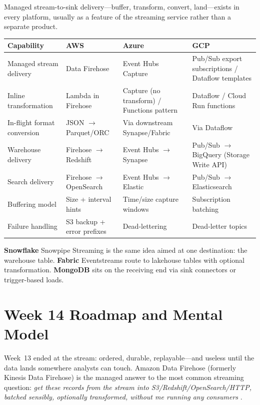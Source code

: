 \begin{crosscloud}
Managed stream-to-sink delivery---buffer, transform, convert, land---exists in every platform, usually as a feature of the streaming service rather than a separate product.

\vspace{2mm}
{\footnotesize
\begin{tabular}{@{}p{2.8cm}p{3.0cm}p{3.0cm}p{3.0cm}@{}}
\toprule
\textbf{Capability} & \textbf{AWS} & \textbf{Azure} & \textbf{GCP} \\
\midrule
Managed stream delivery & Data Firehose & Event Hubs Capture & Pub/Sub export subscriptions / Dataflow templates \\
Inline transformation & Lambda in Firehose & Capture (no transform) / Functions pattern & Dataflow / Cloud Run functions \\
In-flight format conversion & JSON $\rightarrow$ Parquet/ORC & Via downstream Synapse/Fabric & Via Dataflow \\
Warehouse delivery & Firehose $\rightarrow$ Redshift & Event Hubs $\rightarrow$ Synapse & Pub/Sub $\rightarrow$ BigQuery (Storage Write API) \\
Search delivery & Firehose $\rightarrow$ OpenSearch & Event Hubs $\rightarrow$ Elastic & Pub/Sub $\rightarrow$ Elasticsearch \\
\addlinespace
Buffering model & Size + interval hints & Time/size capture windows & Subscription batching \\
Failure handling & S3 backup + error prefixes & Dead-lettering & Dead-letter topics \\
\bottomrule
\end{tabular}}

\vspace{1mm}
\textbf{Snowflake} Snowpipe Streaming is the same idea aimed at one destination: the warehouse table. \textbf{Fabric} Eventstreams route to lakehouse tables with optional transformation. \textbf{MongoDB} sits on the receiving end via sink connectors or trigger-based loads.
\end{crosscloud}

\section{Week 14 Roadmap and Mental Model}
Week~13 ended at the stream: ordered, durable, replayable---and useless until the data lands somewhere analysts can touch. Amazon Data Firehose (formerly Kinesis Data Firehose) is the managed answer to the most common streaming question: \emph{get these records from the stream into S3/Redshift/OpenSearch/HTTP, batched sensibly, optionally transformed, without me running any consumers} \cite{awsFirehoseDocs}.

